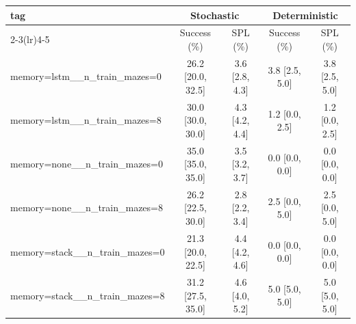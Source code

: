 \begin{tabular}{lcccc}
\toprule
tag & \multicolumn{2}{c}{Stochastic} & \multicolumn{2}{c}{Deterministic} \\
\cmidrule(lr){2-3}\cmidrule(lr){4-5}
 & Success (\%) & SPL (\%) & Success (\%) & SPL (\%) \\
\midrule
memory=lstm__n_train_mazes=0 & 26.2 {\scriptsize[20.0, 32.5]} & 3.6 {\scriptsize[2.8, 4.3]} & 3.8 {\scriptsize[2.5, 5.0]} & 3.8 {\scriptsize[2.5, 5.0]} \\
memory=lstm__n_train_mazes=8 & 30.0 {\scriptsize[30.0, 30.0]} & 4.3 {\scriptsize[4.2, 4.4]} & 1.2 {\scriptsize[0.0, 2.5]} & 1.2 {\scriptsize[0.0, 2.5]} \\
memory=none__n_train_mazes=0 & 35.0 {\scriptsize[35.0, 35.0]} & 3.5 {\scriptsize[3.2, 3.7]} & 0.0 {\scriptsize[0.0, 0.0]} & 0.0 {\scriptsize[0.0, 0.0]} \\
memory=none__n_train_mazes=8 & 26.2 {\scriptsize[22.5, 30.0]} & 2.8 {\scriptsize[2.2, 3.4]} & 2.5 {\scriptsize[0.0, 5.0]} & 2.5 {\scriptsize[0.0, 5.0]} \\
memory=stack__n_train_mazes=0 & 21.3 {\scriptsize[20.0, 22.5]} & 4.4 {\scriptsize[4.2, 4.6]} & 0.0 {\scriptsize[0.0, 0.0]} & 0.0 {\scriptsize[0.0, 0.0]} \\
memory=stack__n_train_mazes=8 & 31.2 {\scriptsize[27.5, 35.0]} & 4.6 {\scriptsize[4.0, 5.2]} & 5.0 {\scriptsize[5.0, 5.0]} & 5.0 {\scriptsize[5.0, 5.0]} \\
\bottomrule
\end{tabular}
